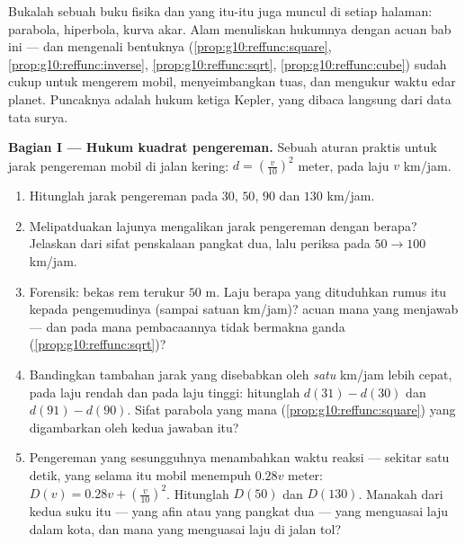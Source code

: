 \begin{problem}
\label{pb:g10:reffunc:1}
Bukalah sebuah buku fisika dan  yang itu-itu juga muncul di setiap
halaman: parabola, hiperbola, kurva akar. Alam menuliskan
hukumnya dengan  acuan bab ini --- dan mengenali
bentuknya (\cref{prop:g10:reffunc:square},
\cref{prop:g10:reffunc:inverse}, \cref{prop:g10:reffunc:sqrt},
\cref{prop:g10:reffunc:cube}) sudah cukup untuk mengerem mobil, menyeimbangkan
tuas, dan mengukur waktu edar planet. Puncaknya adalah hukum ketiga
Kepler, yang dibaca langsung dari data tata surya.

\medskip
\noindent\textbf{Bagian I --- Hukum kuadrat pengereman.}
Sebuah aturan praktis untuk jarak pengereman mobil di jalan kering:
$d = \left(\frac{v}{10}\right)^{2}$ meter, pada laju $v$ km/jam.
\begin{enumerate}
  \item Hitunglah jarak pengereman pada $30$, $50$, $90$ dan
        $130$ km/jam.
  \item Melipatduakan lajunya mengalikan jarak pengereman dengan
        berapa? Jelaskan dari sifat penskalaan  pangkat dua,
        lalu periksa pada $50 \to 100$ km/jam.
  \item Forensik: bekas rem terukur $50$ m. Laju berapa yang
        dituduhkan rumus itu kepada pengemudinya (sampai satuan km/jam)? 
        acuan mana yang menjawab --- dan pada  mana
        pembacaannya tidak bermakna ganda
        (\cref{prop:g10:reffunc:sqrt})?
  \item Bandingkan tambahan jarak yang disebabkan oleh \emph{satu} km/jam
        lebih cepat, pada laju rendah dan pada laju tinggi: hitunglah
        $d(31) - d(30)$ dan $d(91) - d(90)$. Sifat parabola yang mana
        (\cref{prop:g10:reffunc:square}) yang digambarkan oleh kedua
        jawaban itu?
  \item Pengereman yang sesungguhnya menambahkan waktu reaksi --- sekitar satu detik,
        yang selama itu mobil menempuh $0.28v$ meter:
        $D(v) = 0.28v + \left(\frac{v}{10}\right)^2$. Hitunglah
        $D(50)$ dan $D(130)$. Manakah dari kedua suku itu --- yang afin
        atau yang pangkat dua --- yang menguasai laju dalam kota, dan mana yang
        menguasai laju di jalan tol?
\end{enumerate}


\end{problem}

